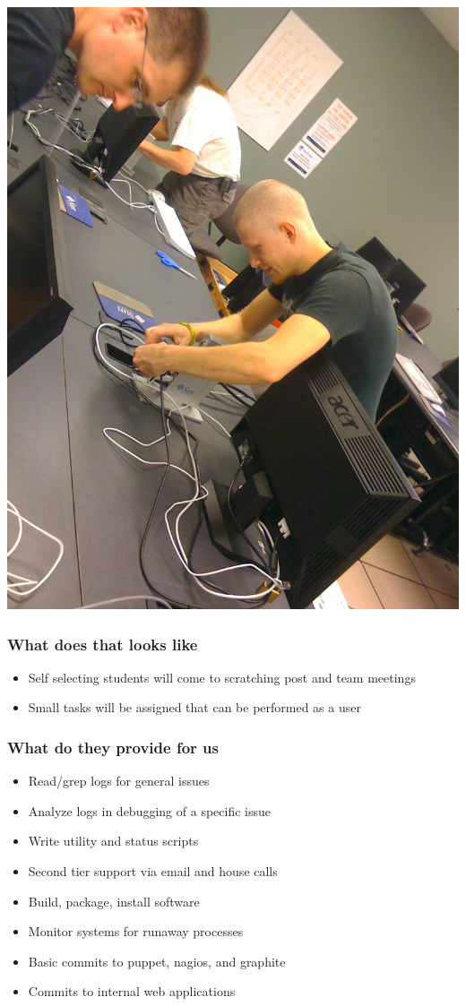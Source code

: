 \documentclass{beamer}
\begin{document}
\frame
{
        \includegraphics[width=1\textwidth]{deskcats.jpg}
}

\frame
{
    \frametitle{What does that looks like}
    \begin{itemize}
      \item Self selecting students will come to scratching post and team meetings
      \item Small tasks will be assigned that can be performed as a user
    \end{itemize}
}

\frame
{
    \frametitle{What do they provide for us}
    \begin{itemize}
      \item Read/grep logs for general issues
      \item Analyze logs in debugging of a specific issue
      \item Write utility and status scripts
      \item Second tier support via email and house calls
      \item Build, package, install software
      \item Monitor systems for runaway processes
      \item Basic commits to puppet, nagios, and graphite
      \item Commits to internal web applications
    \end{itemize}
}
\end{document}
